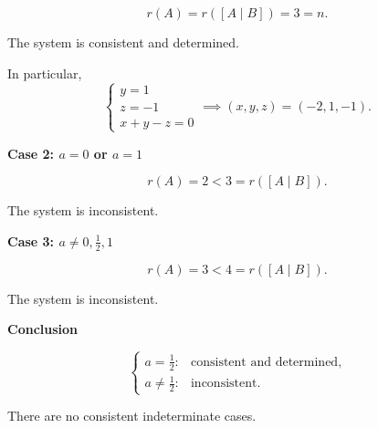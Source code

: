 \begin{answer}
    $$
    r(A)=r([A\mid B])=3=n.
    $$

    The system is consistent and
    determined.

    In particular,
    $$
    \begin{cases}
    y=1\\
    z=-1\\
    x+y-z=0
    \end{cases}
    \implies
    (x,y,z)=(-2,1,-1).
    $$

    \textbf{Case 2: $a=0$ or $a=1$}

    $$
    r(A)=2<3=r([A\mid B]).
    $$

    The system is inconsistent.

    \textbf{Case 3: $a\neq0,\frac12,1$}

    $$
    r(A)=3<4=r([A\mid B]).
    $$

    The system is inconsistent.

    \textbf{Conclusion}

    $$
    \boxed{
    \begin{cases}
    a=\frac12:
    &\text{consistent and determined},\\
    a\neq\frac12:
    &\text{inconsistent}.
    \end{cases}
    }
    $$

    There are no consistent indeterminate cases.
\end{answer}
